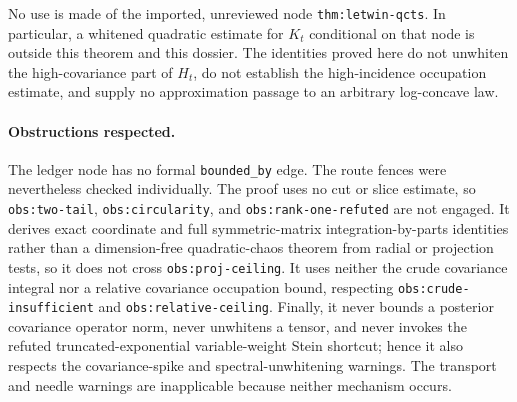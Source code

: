 \documentclass[../main.tex]{subfiles}
\begin{document}
\begin{remark}
No use is made of the imported, unreviewed node \texttt{thm:letwin-qcts}.  In particular, a
whitened quadratic estimate for $K_t$ conditional on that node is outside this theorem and this
dossier.  The identities proved here do not unwhiten the high-covariance part of $H_t$, do not
establish the high-incidence occupation estimate, and supply no approximation passage to an
arbitrary log-concave law.
\end{remark}

\paragraph{Obstructions respected.}
The ledger node has no formal \texttt{bounded\_by} edge.  The route fences were nevertheless
checked individually.  The proof uses no cut or slice estimate, so \texttt{obs:two-tail},
\texttt{obs:circularity}, and \texttt{obs:rank-one-refuted} are not engaged.  It derives exact
coordinate and full symmetric-matrix integration-by-parts identities rather than a
dimension-free quadratic-chaos theorem from radial or projection tests, so it does not cross
\texttt{obs:proj-ceiling}.  It uses neither the crude covariance integral nor a relative
covariance occupation bound, respecting \texttt{obs:crude-insufficient} and
\texttt{obs:relative-ceiling}.  Finally, it never bounds a posterior covariance operator norm,
never unwhitens a tensor, and never invokes the refuted truncated-exponential variable-weight
Stein shortcut; hence it also respects the covariance-spike and spectral-unwhitening warnings.
The transport and needle warnings are inapplicable because neither mechanism occurs.
\end{document}
